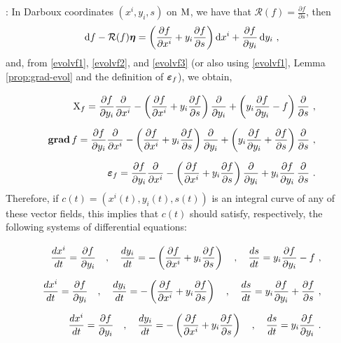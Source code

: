 \documentclass[12pt]{report}
\def\dst{\displaystyle}
\def\derpar#1#2{\frac{\partial{#1}}{\partial{#2}}}
\def\d{{\rm d}}
\def\bmeta{\mbox{\boldmath $\eta$}}
\def\evo{\mbox{\boldmath $\varepsilon$}}
\def\X{{\rm X}}
\newcommand{\Reeb}{\mathcal{R}}
\begin{document}
:
In Darboux coordinates $(x^i, y_i,s)$ on ${\rm M}$, we have that $\dst \Reeb(f)=\derpar{f}{s}$, then
$$
\d f-\Reeb(f)\bmeta=\left(\frac{\partial f}{\partial x^i} + 
y_i\frac{\partial f}{\partial s}\right)\d x^i+\derpar{f}{y_i}\,\d y_i \ ,
$$
and, from \eqref{evolvf1}, \eqref{evolvf2}, and \eqref{evolvf3} (or also using \eqref{evolvf1}, Lemma \ref{prop:grad-evol} and the definition of $\evo_f$), we obtain,
\begin{align}
\noalign{\medskip}
\X_f= \frac{\partial f}{\partial y_i}\frac{\partial}{\partial x^i} - 
\left(\frac{\partial f}{\partial x^i} + 
y_i\frac{\partial f}{\partial s}\right)\frac{\partial}{\partial y_i} + 
\left(y_i\frac{\partial f}{\partial y_i} - f\right)\frac{\partial}{\partial s}\ , 
\label{evocoor01} \\ 
\noalign{\medskip} {\bf grad}\,f = \frac{\partial f}{\partial y_i}\frac{\partial}{\partial x^i} - 
\left(\frac{\partial f}{\partial x^i} + 
y_i\frac{\partial f}{\partial s}\right)\frac{\partial}{\partial y_i} + 
\left(y_i\frac{\partial f}{\partial y_i} + \derpar{f}{s}\right)\frac{\partial}{\partial s}\ , \label{evocoor02} \\
\noalign{\medskip}
\evo_f = \frac{\partial f}{\partial y_i}\frac{\partial}{\partial x^i} - 
\left(\frac{\partial f}{\partial x^i} + 
y_i\frac{\partial f}{\partial s}\right)\frac{\partial}{\partial y_i} + 
y_i\frac{\partial f}{\partial y_i}\,\frac{\partial}{\partial s}\ .
\label{evocoor03}
\end{align}
Therefore, if $c(t)=(x^i(t), y_i(t),s(t))$ is an integral curve of any of these vector fields, this implies that $c(t)$ should satisfy,
respectively, the following systems of differential equations:
\begin{align}
\noalign{\medskip}
\label{hel-eqs01}
\dst\frac{dx^i}{dt} = \frac{\partial f}{\partial y_i}\quad ,\quad
\dst\frac{dy_i}{dt} = -\left(\frac{\partial f}{\partial x^i} + y_i\frac{\partial f}{\partial s}\right)\quad , \quad
\dst\frac{ds}{dt} = y_i\frac{\partial f}{\partial y_i} - f \ ,  \\
\noalign{\medskip}\nonumber
\dst\frac{dx^i}{dt} = \frac{\partial f}{\partial y_i} \quad  ,\quad
\dst\frac{dy_i}{dt} = -\left(\frac{\partial f}{\partial x^i} + y_i\frac{\partial f}{\partial s}\right)\quad ,
\quad \dst\frac{ds}{dt} = y_i\frac{\partial f}{\partial y_i} + \derpar{f}{s}\ , \\
\noalign{\medskip}\nonumber
\dst\frac{dx^i}{dt} = \frac{\partial f}{\partial y_i}\quad ,\quad
\dst\frac{dy_i}{dt} = -\left(\frac{\partial f}{\partial x^i} + y_i\frac{\partial f}{\partial s}\right)\quad ,\quad
\dst\frac{ds}{dt} = y_i\frac{\partial f}{\partial y_i} \ . 
\end{align}
\end{document}
